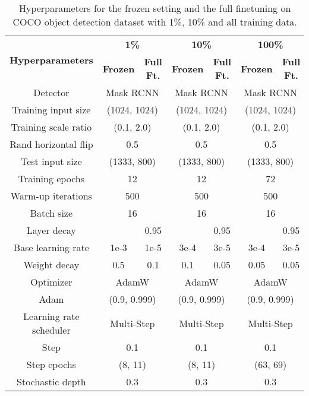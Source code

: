 \documentclass{article}
\newcommand{\xmark}{\text{\ding{55}}}
\begin{document}
\begin{table}[h]\small
    \centering \begin{tabular}{c|cc|cc|cc}
    \toprule
    \multirow{2}{*}{\textbf{Hyperparameters}} & \multicolumn{2}{c|}{\textbf{1\%}} & \multicolumn{2}{c|}{\textbf{10\%}} & \multicolumn{2}{c}{\textbf{100\%}} \\
    & \textbf{Frozen} & \textbf{Full Ft.} & \textbf{Frozen} & \textbf{Full Ft.} & \textbf{Frozen} & \textbf{Full Ft.}\\
    \hline
    Detector & \multicolumn{2}{c|}{Mask RCNN} & \multicolumn{2}{c|}{Mask RCNN} & \multicolumn{2}{c}{Mask RCNN} \\
    Training input size & \multicolumn{2}{c|}{(1024, 1024)} & \multicolumn{2}{c|}{(1024, 1024)} & \multicolumn{2}{c}{(1024, 1024)} \\
    Training scale ratio & \multicolumn{2}{c|}{(0.1, 2.0)} & \multicolumn{2}{c|}{(0.1, 2.0)} & \multicolumn{2}{c}{(0.1, 2.0)} \\
    Rand horizontal flip & \multicolumn{2}{c|}{0.5} & \multicolumn{2}{c|}{0.5} & \multicolumn{2}{c}{0.5} \\
    Test input size & \multicolumn{2}{c|}{(1333, 800)} & \multicolumn{2}{c|}{(1333, 800)} & \multicolumn{2}{c}{(1333, 800)} \\
    \hline
    Training epochs & \multicolumn{2}{c|}{12} & \multicolumn{2}{c|}{12} & \multicolumn{2}{c}{72} \\
    Warm-up iterations & \multicolumn{2}{c|}{500} & \multicolumn{2}{c|}{500} & \multicolumn{2}{c}{500} \\
    Batch size & \multicolumn{2}{c|}{16} & \multicolumn{2}{c|}{16} & \multicolumn{2}{c}{16} \\
    Layer decay & \xmark & 0.95 & \xmark & 0.95 & \xmark & 0.95 \\
    Base learning rate & 1e-3 & 1e-5 & 3e-4 & 3e-5 & 3e-4 & 3e-5 \\
    Weight decay & 0.5 & 0.1 & 0.1 & 0.05 & 0.05 & 0.05 \\
    Optimizer & \multicolumn{2}{c|}{AdamW} & \multicolumn{2}{c|}{AdamW} & \multicolumn{2}{c}{AdamW} \\
    Adam  & \multicolumn{2}{c|}{(0.9, 0.999)} & \multicolumn{2}{c|}{(0.9, 0.999)} & \multicolumn{2}{c}{(0.9, 0.999)} \\
    Learning rate scheduler & \multicolumn{2}{c|}{Multi-Step}  & \multicolumn{2}{c|}{Multi-Step}  & \multicolumn{2}{c}{Multi-Step}  \\
    Step  & \multicolumn{2}{c|}{0.1} & \multicolumn{2}{c|}{0.1} & \multicolumn{2}{c}{0.1} \\
    Step epochs & \multicolumn{2}{c|}{(8, 11)} & \multicolumn{2}{c|}{(8, 11)} & \multicolumn{2}{c}{(63, 69)} \\
    Stochastic depth & \multicolumn{2}{c|}{0.3} & \multicolumn{2}{c|}{0.3} & \multicolumn{2}{c}{0.3} \\
    \bottomrule
    \end{tabular}
    \vspace{0.5em}
    \caption{Hyperparameters for the frozen setting and the full finetuning on COCO object detection dataset with 1\%, 10\% and all training data.}
    \label{table:setting-coco}
\end{table}
\end{document}
